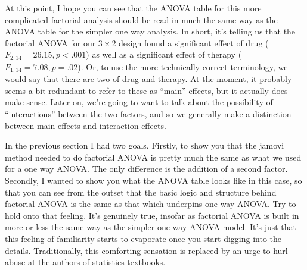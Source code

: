 At this point, I hope you can see that the ANOVA table for this more complicated factorial analysis should be read in much the same way as the ANOVA table for the simpler one way analysis. In short, it's telling us that the factorial ANOVA for our $3 \times 2$ design found a significant effect of drug ($F_{2,14} = 26.15, p < .001$) as well as a significant effect of therapy ($F_{1,14} = 7.08, p = .02$). Or, to use the more technically correct terminology, we would say that there are two  of drug and therapy. At the moment, it probably seems a bit redundant to refer to these as ``main'' effects, but it actually does make sense. Later on, we're going to want to talk about the possibility of ``interactions'' between the two factors, and so we generally make a distinction between main effects and interaction effects. 


In the previous section I had two goals. Firstly, to show you that the jamovi method needed to do factorial ANOVA is pretty much the same as what we used for a one way ANOVA. The only difference is the addition of a second factor. Secondly, I wanted to show you what the ANOVA table looks like in this case, so that you can see from the outset that the basic logic and structure behind factorial ANOVA is the same as that which underpins one way ANOVA. Try to hold onto that feeling. It's genuinely true, insofar as factorial ANOVA is built in more or less the same way as the simpler one-way ANOVA model. It's just that this feeling of familiarity starts to evaporate once you start digging into the details. Traditionally, this comforting sensation is replaced by an urge to hurl abuse at the authors of statistics textbooks.

